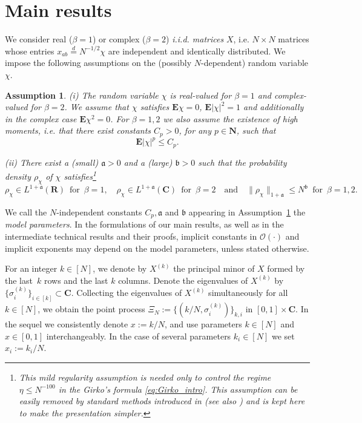 \documentclass[10pt]{amsart}
\newtheorem{assumption}[theorem]{Assumption}
\numberwithin{equation}{section}
\newcommand{\nc}{\normalcolor}
\newcommand{\E}{\mathbf{E}}
\newcommand{\R}{\mathbf{R}}
\newcommand{\C}{\mathbf{C}}
\newcommand{\N}{\mathbf{N}}
\begin{document}
\section{Main results}\label{sec:results}

We consider real ($\beta=1$) or complex ($\beta=2$) \emph{i.i.d. matrices} $X$, i.e. $N\times N$ matrices whose entries $x_{ab}\stackrel{d}{=}N^{-1/2}\chi$ are independent and identically distributed. We impose the following assumptions on the (possibly $N$-dependent) random variable $\chi$.

\begin{assumption}\label{ass:chi}
\emph{(i)} The random variable $\chi$ is real-valued for $\beta=1$ and complex-valued for $\beta=2$. We assume that $\chi$ satisfies $\E \chi=0$, $\E |\chi|^2=1$ and additionally in the complex case $\E\chi^2=0$. For $\beta=1,2$ we also assume the existence of high moments, i.e. that there exist constants $C_p>0$, for any $p\in \N$, such that  
\begin{equation}
\E |\chi|^p\le C_p.
\label{eq:momass}
\end{equation}

\noindent\emph{(ii)} There exist a (small) $\mathfrak{a}>0$ and a (large) $\mathfrak{b}>0$ such that the probability density $\rho_\chi$ of $\chi$ satisfies\footnote{This mild regularity assumption is needed only to control the regime $\eta\le N^{-100}$ in the Girko's formula \eqref{eq:Girko_intro}. This assumption can be easily removed by standard methods introduced in \cite{TaoVu15} (see also \cite[Remark~2.2]{rightmost_ev}) and is kept here to make the presentation simpler.\nc}
\begin{equation}
\rho_\chi \in L^{1+\mathfrak{a}}(\R)\,\,\,\text{for}\,\,\, \beta=1,\quad \rho_\chi \in L^{1+\mathfrak{a}}(\C)\,\,\,\text{for}\,\,\, \beta=2\quad\text{and}\quad \|\rho_\chi\|_{1+\mathfrak{a}}\le N^\mathfrak{b}\,\,\, \text{for}\,\,\, \beta=1,2.
\label{eq:reg_ass}
\end{equation}
\end{assumption}

We call the $N$-independent constants $C_p, \mathfrak{a}$ and $\mathfrak{b}$ appearing in Assumption~\ref{ass:chi} the \emph{model parameters}. In the formulations of our main results, as well as in the intermediate technical results and their proofs, implicit constants in $\mathcal{O}(\cdot)$ and implicit exponents may depend on the model parameters, unless stated otherwise.

For an integer $k\in [N]$, we denote by $X^{(k)}$ the principal minor of $X$ formed by the last~$k$ rows and the last $k$ columns. Denote the eigenvalues of $X^{(k)}$ by $\{\sigma_i^{(k)}\}_{i\in [k]}\subset \C$. Collecting the eigenvalues of $X^{(k)}$ simultaneously for all $k\in[N]$, we obtain the point process $\Xi_N:=\{(k/N,\sigma_i^{(k)})\}_{k,i}$ in $[0,1]\times \C$. In the sequel we consistently denote $x:=k/N$, and use parameters $k\in [N]$ and $x\in [0,1]$ interchangeably. In the case of several parameters $k_i\in[N]$ we set $x_i:=k_i/N$.
\end{document}
